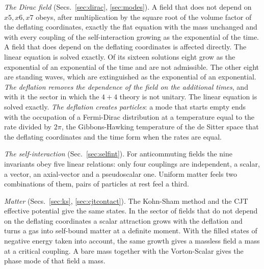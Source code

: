 \emph{The Dirac field} (Secs.~\ref{sec:dirac}, \ref{sec:modes}). A field that does not depend on
$x5,x6,x7$ obeys, after multiplication by the square root of the volume factor of the deflating
coordinates, exactly the flat equation with the mass unchanged and with every coupling of the
self-interaction growing as the exponential of the time. A field that does depend on the deflating
coordinates is affected directly.
The linear equation is solved exactly. Of its sixteen solutions eight grow as the exponential of an
exponential of the time and are not admissible. The other eight are standing waves, which are
extinguished as the exponential of an exponential. \emph{The deflation removes the dependence of the
field on the additional times}, and with it the sector in which the $4+4$ theory is not unitary.
The linear equation is solved exactly. \emph{The deflation creates particles}: a mode that starts
empty ends with the occupation of a Fermi-Dirac distribution at a temperature equal to the rate
divided by $2\pi$, the Gibbons-Hawking temperature of the de Sitter space that the deflating
coordinates and the time form when the rates are equal.

\emph{The self-interaction} (Sec.~\ref{sec:selfint}). For anticommuting fields the nine invariants
obey five linear relations: only four couplings are independent, a scalar, a vector, an axial-vector
and a pseudoscalar one. Uniform matter feels two combinations of them, pairs of particles at rest
feel a third. 

\emph{Matter} (Secs.~\ref{sec:ks}, \ref{sec:cjtcontact}). The Kohn-Sham method and the CJT effective
potential give the same states. In the sector of fields
that do not depend on the deflating coordinates a scalar attraction grows with the deflation and
turns a gas into self-bound matter at a definite moment. With the filled states of negative energy
taken into account, the same growth gives a massless field a mass at a critical coupling. A bare
mass together with the Vorton-Scalar gives the phase mode of that field a mass.

